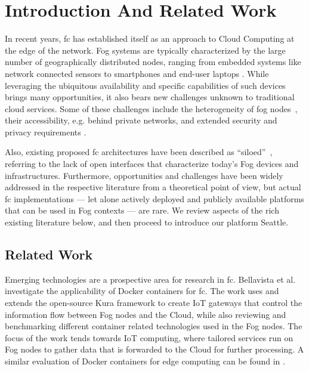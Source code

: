 \section{Introduction And Related Work}

In recent years, \gls{fc} has established itself as an approach to
Cloud Computing at the edge of the network. Fog systems are typically
characterized by the large number of geographically distributed
nodes, ranging
from embedded systems like network connected
sensors to smartphones and end-user laptops
\cite{Bonomi:2012:FCR:2342509.2342513,Yi:2015:SFC:2757384.2757397,dastjerdi_fog_2016}.
While leveraging the
ubiquitous availability and specific capabilities of such devices brings
many opportunities, it also bears new challenges unknown to traditional cloud
services. Some of these challenges include the heterogeneity of fog
nodes~\cite{Bonomi:2012:FCR:2342509.2342513,7868354,Yi:2015:SFC:2757384.2757397,mahmud_fog_2016},
their accessibility, e.g. behind private networks, and extended security and
privacy requirements \cite{botta_integration_2016}.

Also, existing proposed \gls{fc} architectures have been described
as ``siloed''~\cite{belli_design_2015}, referring to the lack of
open interfaces that characterize today's Fog devices and infrastructures.
Furthermore, opportunities and challenges have been widely addressed in the
respective literature from a theoretical point of view, but actual \gls{fc}
implementations --- let alone actively deployed and
publicly available platforms that can be used in Fog contexts --- are rare.
We review aspects of the rich existing literature below, and then
proceed to introduce our platform Seattle.


\subsection{Related Work}

Emerging technologies are a prospective area for research in \gls{fc}.
Bellavista et al.~\cite{bellavista_feasibility_2017} investigate the
applicability of Docker containers for \gls{fc}. The work uses and extends
the open-source Kura framework to create \gls{IoT} gateways that control the information
flow between Fog nodes and the Cloud, while also reviewing and benchmarking
different container related technologies used in the Fog nodes.
The focus of the work tends towards \gls{IoT} computing, where tailored services run
on Fog nodes to gather data that is forwarded to the Cloud for further processing.
A similar evaluation of Docker containers for edge computing can be found in
\cite{ismail_evaluation_2015}.


